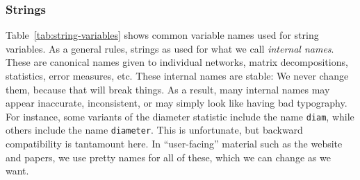 \documentclass{article}
\begin{document}
\subsubsection{Strings}
Table~\ref{tab:string-variables} shows common variable names used for
string variables.
As a general rules, strings as used for what we call \emph{internal
  names}.  These are canonical names given to individual networks,
matrix decompositions, statistics, error measures, etc.  These internal
names are stable:  We never change them, because that will break
things.  As a result, many internal names may appear inaccurate,
inconsistent, or may simply look like having bad typography.  For
instance, some variants of the diameter statistic include the name
\texttt{diam}, while others include the name \texttt{diameter}.  This is
unfortunate, but backward compatibility is tantamount here.  In
``user-facing'' material such as the website and papers, we use pretty
names for all of these, which we can change as we want. 
\end{document}
